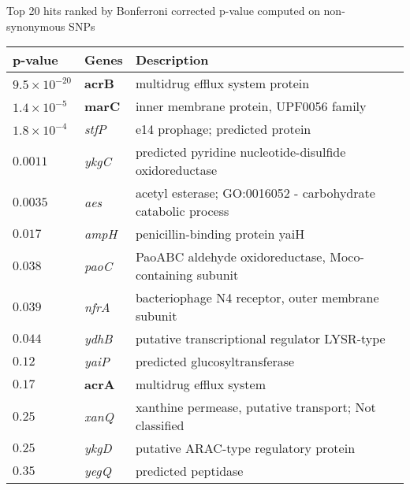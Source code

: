 \documentclass[letterpaper,10pt,english]{howto}
\begin{document}
\begin{threeparttable}
\caption{Top 20 hits ranked by Bonferroni corrected p-value computed on non-synonymous SNPs}

\begin{tabulary}{\textwidth}{|L|L|L|}
\hline
\textbf{
p-value
} & \textbf{
Genes
} & \textbf{
Description
}\\
\hline

$9.5 \times 10^{-20}$
 & 
\textbf{acrB}
 & 
multidrug efflux system protein
\\

$1.4 \times 10^{-5}$
 & 
\textbf{marC}
 & 
inner membrane protein, UPF0056 family
\\

$1.8 \times 10^{-4}$
 & 
\emph{stfP}
 & 
e14 prophage; predicted protein
\\

$0.0011$
 & 
\emph{ykgC}
 & 
predicted pyridine nucleotide-disulfide oxidoreductase
\\

$0.0035$
 & 
\emph{aes}
 & 
acetyl esterase; GO:0016052 - carbohydrate catabolic process
\\

$0.017$
 & 
\emph{ampH}
 & 
penicillin-binding protein yaiH
\\

$0.038$
 & 
\emph{paoC}
 & 
PaoABC aldehyde oxidoreductase, Moco-containing subunit
\\

$0.039$
 & 
\emph{nfrA}
 & 
bacteriophage N4 receptor, outer membrane subunit
\\

$0.044$
 & 
\emph{ydhB}
 & 
putative transcriptional regulator LYSR-type
\\

$0.12$
 & 
\emph{yaiP}
 & 
predicted glucosyltransferase
\\

$0.17$
 & 
\textbf{acrA}
 & 
multidrug efflux system
\\

$0.25$
 & 
\emph{xanQ}
 & 
xanthine permease, putative transport; Not classified
\\

$0.25$
 & 
\emph{ykgD}
 & 
putative ARAC-type regulatory protein
\\

$0.35$
 & 
\emph{yegQ}
 & 
predicted peptidase
\\


\end{tabulary}
\end{threeparttable}
\end{document}
